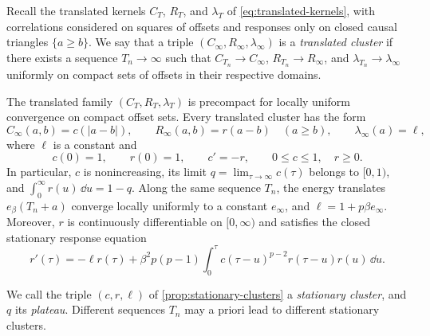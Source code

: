 Recall the translated kernels $C_T$, $R_T$, and $\lambda_T$ of \eqref{eq:translated-kernels}, with correlations considered on squares of offsets and responses only on closed causal triangles $\{a\ge b\}$. We say that a triple $(C_\infty,R_\infty,\lambda_\infty)$ is a \emph{translated cluster} if there exists a sequence $T_n\to\infty$ such that $C_{T_n}\to C_\infty$, $R_{T_n}\to R_\infty$, and $\lambda_{T_n}\to\lambda_\infty$ uniformly on compact sets of offsets in their respective domains.

\begin{proposition}\label{prop:stationary-clusters}
The translated family $(C_T,R_T,\lambda_T)$ is precompact for locally uniform convergence on compact offset sets. Every translated cluster has the form
\[
 C_\infty(a,b)=c(|a-b|),\qquad
 R_\infty(a,b)=r(a-b)\quad(a\ge b),\qquad
 \lambda_\infty(a)=\ell,
\]
where $\ell$ is a constant and
\begin{equation}
 c(0)=1,\qquad r(0)=1,\qquad c'=-r,\qquad
 0\le c\le1,\quad r\ge0.
 \label{eq:cluster-fdt-properties}
\end{equation}
In particular, $c$ is nonincreasing, its limit $q=\lim_{\tau\to\infty}c(\tau)$ belongs to $[0,1)$, and $\int_0^\infty r(u)\,\dd u=1-q$. Along the same sequence $T_n$, the energy translates $e_\beta(T_n+a)$ converge locally uniformly to a constant $e_\infty$, and $\ell=1+p\beta e_\infty$. Moreover, $r$ is continuously differentiable on $[0,\infty)$ and satisfies the closed stationary response equation
\begin{equation}
 r'(\tau)=-\ell r(\tau)
 +\beta^2p(p-1)\int_0^\tau c(\tau-u)^{p-2}r(\tau-u)r(u)\,\dd u.
 \label{eq:stationary-cluster-response}
\end{equation}
\end{proposition}

We call the triple $(c,r,\ell)$ of \cref{prop:stationary-clusters} a \emph{stationary cluster}, and $q$ its \emph{plateau}. Different sequences $T_n$ may a priori lead to different stationary clusters.

